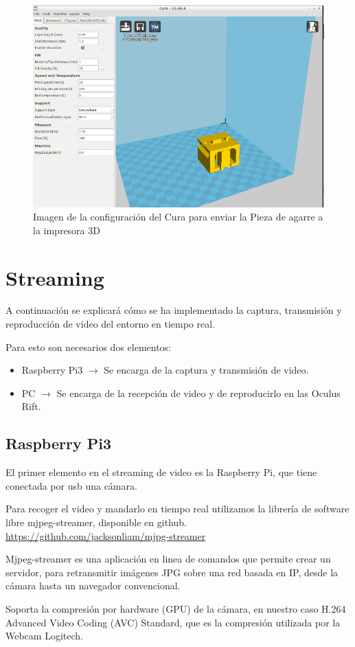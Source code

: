 \documentclass[twoside, 11pt]{epstfg}
\begin{document}
\begin{figure}[h]
	\centerline{
		\mbox{\includegraphics[width=.75\textwidth]{images/Cura2.png}}
	}
	\caption{Imagen de la configuración del Cura para enviar la Pieza de agarre a la impresora 3D}
\end{figure}
 
\newpage
\section{Streaming}
A continuación se explicará cómo se ha implementado la captura, transmisión y reproducción de video del entorno en tiempo real.

Para esto son necesarios dos elementos:
\begin{itemize}
	\item Raspberry Pi3 $\rightarrow$ Se encarga de la captura y transmisión de video.
	\item PC $\rightarrow$ Se encarga de la recepción de video y de reproducirlo en las Oculus Rift.
\end{itemize}
\subsection{Raspberry Pi3}
El primer elemento en el streaming de video es la Raspberry Pi, que tiene conectada por usb una cámara.

Para recoger el video y mandarlo en tiempo real utilizamos la librería de software libre mjpeg-streamer, disponible en github. \url{https://github.com/jacksonliam/mjpg-streamer}

Mjpeg-streamer es una aplicación en linea de comandos que permite crear un servidor, para retransmitir imágenes JPG sobre una red basada en IP, desde la cámara hasta un navegador convencional.

Soporta la compresión por hardware (GPU) de la cámara, en nuestro caso H.264 Advanced Video Coding (AVC) Standard, que es la compresión utilizada por la Webcam Logitech.
\end{document}
